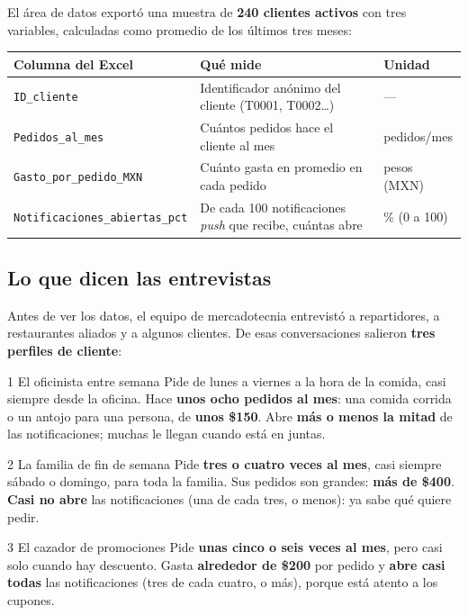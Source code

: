 \documentclass[11pt,letterpaper]{article}
\newcommand{\col}[1]{\texttt{\footnotesize #1}}
\begin{document}
El \'area de datos export\'o una muestra de \textbf{240 clientes activos} con tres variables, calculadas como promedio de los \'ultimos tres meses:

\begin{center}
\begin{tabularx}{\linewidth}{@{}>{\raggedright\arraybackslash}p{5.6cm}>{\raggedright\arraybackslash}Xl@{}}
\toprule
\textbf{Columna del Excel} & \textbf{Qu\'e mide} & \textbf{Unidad} \\
\midrule
\col{ID\_cliente} & Identificador an\'onimo del cliente (T0001, T0002\ldots) & --- \\
\col{Pedidos\_al\_mes} & Cu\'antos pedidos hace el cliente al mes & pedidos/mes \\
\col{Gasto\_por\_pedido\_MXN} & Cu\'anto gasta en promedio en cada pedido & pesos (MXN) \\
\col{Notificaciones\_abiertas\_pct} & De cada 100 notificaciones \emph{push} que recibe, cu\'antas abre & \% (0 a 100) \\
\bottomrule
\end{tabularx}
\end{center}

\subsection{Lo que dicen las entrevistas}

Antes de ver los datos, el equipo de mercadotecnia entrevist\'o a repartidores, a restaurantes aliados y a algunos clientes. De esas conversaciones salieron \textbf{tres perfiles de cliente}:

\begin{entrevista}{1 \textperiodcentered{} El oficinista entre semana}
Pide de lunes a viernes a la hora de la comida, casi siempre desde la oficina. Hace \textbf{unos ocho pedidos al mes}: una comida corrida o un antojo para una persona, de \textbf{unos \$150}. Abre \textbf{m\'as o menos la mitad} de las notificaciones; muchas le llegan cuando est\'a en juntas.
\end{entrevista}
\begin{entrevista}{2 \textperiodcentered{} La familia de fin de semana}
Pide \textbf{tres o cuatro veces al mes}, casi siempre s\'abado o domingo, para toda la familia. Sus pedidos son grandes: \textbf{m\'as de \$400}. \textbf{Casi no abre} las notificaciones (una de cada tres, o menos): ya sabe qu\'e quiere pedir.
\end{entrevista}
\begin{entrevista}{3 \textperiodcentered{} El cazador de promociones}
Pide \textbf{unas cinco o seis veces al mes}, pero casi solo cuando hay descuento. Gasta \textbf{alrededor de \$200} por pedido y \textbf{abre casi todas} las notificaciones (tres de cada cuatro, o m\'as), porque est\'a atento a los cupones.
\end{entrevista}
\end{document}
